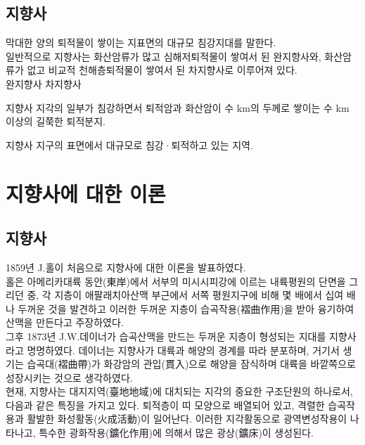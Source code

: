 \documentclass[12pt,a4paper]{book}
\newcommand{\SectionMargin}			{\newpage  \null \vskip 0cm}
\begin{document}
	\subsection{지향사}

		막대한 양의 퇴적물이 쌓이는 지표면의 대규모 침강지대를 말한다. 
		\\[-1.0em]

		일반적으로 지향사는 화산암류가 많고 심해저퇴적물이 쌓여서 된 완지향사와, 
		화산암류가 없고 비교적 천해층퇴적물이 쌓여서 된 차지향사로 이루어져 있다.  
		\\[-1.0em]

		완지향사
		차지향사

		지향사 
		지각의 일부가 침강하면서 퇴적암과 화산암이 수 km의 두께로 쌓이는 수 km 이상의 길쭉한 퇴적분지. 

		지향사 
		지구의 표면에서 대규모로 침강·퇴적하고 있는 지역. 



	\SectionMargin
	\section{	지향사에 대한 이론}

	\subsection{지향사}

		1859년 J.홀이 처음으로 지향사에 대한 이론을 발표하였다. 
		\\[-1.0em]

		홀은 아메리카대륙 동안(東岸)에서 서부의 미시시피강에 이르는 내륙평원의 단면을 그리던 중, 
		각 지층이 애팔래치아산맥 부근에서 서쪽 평원지구에 비해 몇 배에서 십여 배나 두꺼운 것을 발견하고 
		이러한 두꺼운 지층이 습곡작용(褶曲作用)을 받아 융기하여 산맥을 만든다고 주장하였다. 
		\\[-1.0em]

		그후 1873년 J.W.데이너가 습곡산맥을 만드는 두꺼운 지층이 형성되는 지대를 지향사라고 명명하였다. 
		데이너는 지향사가 대륙과 해양의 경계를 따라 분포하며, 
		거기서 생기는 습곡대(褶曲帶)가 화강암의 관입(貫入)으로 해양을 잠식하며 대륙을 바깥쪽으로 성장시키는 것으로 생각하였다.
		\\[-1.0em]

		현재, 지향사는 대지지역(臺地地域)에 대치되는 지각의 중요한 구조단원의 하나로서, 다음과 같은 특징을 가지고 있다. 
		퇴적층이 띠 모양으로 배열되어 있고, 격렬한 습곡작용과 활발한 화성활동(火成活動)이 일어난다. 
		이러한 지각활동으로 광역변성작용이 나타나고, 특수한 광화작용(鑛化作用)에 의해서 많은 광상(鑛床)이 생성된다.
		\\[-1.0em]
\end{document}
